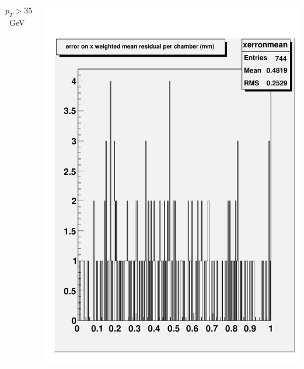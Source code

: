 \documentclass[compress]{beamer}
\begin{document}
\begin{frame}
\begin{center}
\begin{columns}
$p_T > 35$~GeV

\includegraphics[width=\linewidth]{xerronmeanPT35.pdf}
\end{columns}
\end{center}

\end{frame}
\end{document}
